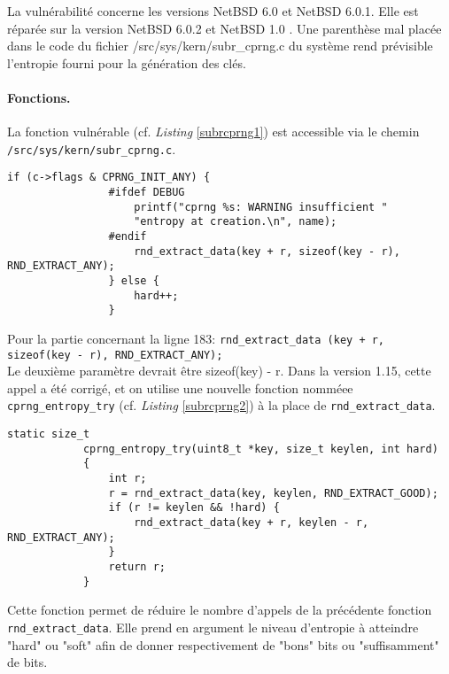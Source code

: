 			La vulnérabilité concerne les versions NetBSD 6.0 et NetBSD 6.0.1. Elle est réparée sur la version NetBSD 6.0.2 et NetBSD 1.0 \cite{diffNetBSD}.	Une parenthèse mal placée dans le code du fichier /src/sys/kern/subr\_cprng.c du système rend prévisible l'entropie fourni pour la génération des clés.\\
			
			\paragraph{Fonctions.\\} 
			
			La fonction vulnérable (cf. \textit{Listing} \ref{subrcprng1}) est accessible via le chemin \texttt{/src/sys/kern/subr\_cprng.c}.
			
			\begin{lstlisting}[style=customc,caption=subr\_cprng.c(1),
			 label=subrcprng1]
				if (c->flags & CPRNG_INIT_ANY) {
				#ifdef DEBUG
					printf("cprng %s: WARNING insufficient "
					"entropy at creation.\n", name);
				#endif
					rnd_extract_data(key + r, sizeof(key - r), RND_EXTRACT_ANY);
				} else {
					hard++;
				}
			\end{lstlisting}
			
			Pour la partie concernant la ligne 183: \texttt{rnd\_extract\_data (key + r, sizeof(key - r), RND\_EXTRACT\_ANY);}\\ 
			Le deuxième paramètre devrait être sizeof(key) - r.	Dans la version 1.15, cette appel a été corrigé, et on utilise une nouvelle fonction nomméee \texttt{cprng\_entropy\_try} (cf. \textit{Listing} \ref{subrcprng2}) \cite{diffNetBSD} à la place de \texttt{rnd\_extract\_data}.
			
			\begin{lstlisting}[style=customc,caption=subr\_cprng.c(2), label=subrcprng2]
			static size_t
 	 		cprng_entropy_try(uint8_t *key, size_t keylen, int hard)
 	 		{
 	        	int r;
 	         	r = rnd_extract_data(key, keylen, RND_EXTRACT_GOOD);
 	         	if (r != keylen && !hard) {
 	            	rnd_extract_data(key + r, keylen - r, RND_EXTRACT_ANY);
 	         	}
 	    		return r;
 	    	}
			\end{lstlisting}

			Cette fonction permet de réduire le nombre d'appels de la précédente fonction \texttt{rnd\_extract\_data}. Elle prend en argument le niveau d'entropie à atteindre "hard" ou "soft" afin de donner respectivement de "bons" bits ou "suffisamment" de bits. 

